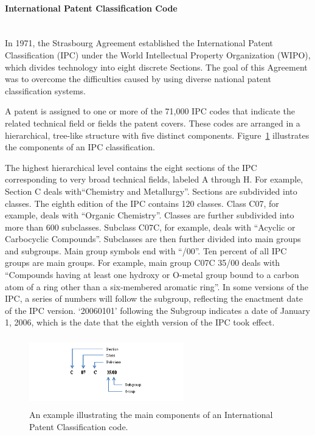 \paragraph{International Patent Classification Code}
\ \\ 
In 1971, the Strasbourg Agreement established the International Patent Classification (IPC) under the World Intellectual Property Organization (WIPO), which divides technology into eight discrete Sections. The goal of this
Agreement was to overcome the difficulties caused by using diverse national patent classification systems.~\citep{harris2010comparison}

A patent is assigned to one or more of the 71,000 IPC codes that 
indicate the related technical field or fields the patent covers. 
These codes are arranged in a hierarchical, tree-like structure with 
five distinct components. Figure~\ref{fig:ipcexample} illustrates the components of an IPC classification.

The highest hierarchical level contains the eight sections of the IPC corresponding
to very broad technical fields, labeled A through H. For example, Section C deals
with``Chemistry and Metallurgy''. Sections are subdivided into classes. The eighth edition of the IPC contains 120
classes. Class C07, for example, deals with ``Organic Chemistry''. Classes are further subdivided into more than 600 subclasses. Subclass C07C, for example, deals with ``Acyclic or Carbocyclic Compounds''. Subclasses are then further divided into main groups and subgroups. Main group symbols end with ``/00''. Ten percent of all IPC groups are main
groups. For example, main group C07C 35/00 deals with ``Compounds having at
least one hydroxy or O-metal group bound to a carbon atom of a ring other than
a six-membered aromatic ring''. In some versions of the IPC, a series of numbers will follow the subgroup, reflecting
the enactment date of the IPC version. `20060101' following the Subgroup
indicates a date of January 1, 2006, which is the date that the eighth version of
the IPC took effect. 
\begin{figure}[t!]
   \centering
   \includegraphics[width=0.60\textwidth,height=30mm]{figs/IPCexample.jpg}
   \caption{An example illustrating the main components of an International Patent Classification code.}   
   \label{fig:ipcexample} 
\end{figure}

